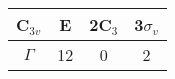 \begin{tabular}{|c|c|c|c|}
\hline
C$_{3v}$ & E & 2C$_3$ & 3$\sigma_v$ \\ \hline
$\Gamma$ & 12 & 0 & 2 \\ \hline
\end{tabular}